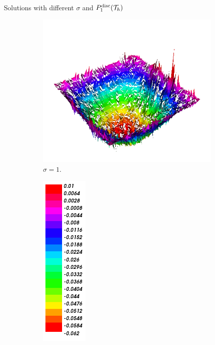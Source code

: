 \begin{frame}{Solutions with different $\sigma$ and $\relax{P}^{\text{disc}}_1(\mathcal{T}_h)$}
\begin{figure}[h!]
			\begin{subfigure}[b]{0.27\textwidth}
				\centering
				\includegraphics[scale=0.18]{img/Difusion/Recortes/steady_diffusion_approx_sigma_1.png}
				\caption{\scriptsize $\sigma=1$.}
			\end{subfigure}
			\begin{subfigure}[b]{0.15\textwidth}
				\centering
				\includegraphics[scale=0.23]{img/Difusion/Recortes/steady_diffusion_values.png}
			\end{subfigure}
			\begin{subfigure}[b]{0.27\textwidth}
				\centering

\end{subfigure}
\end{figure}
\end{frame}
